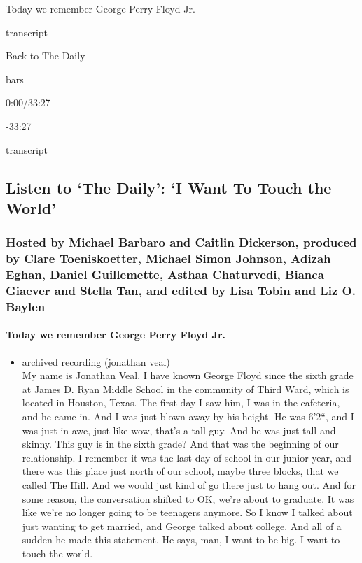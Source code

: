 Today we remember George Perry Floyd Jr.

transcript

Back to The Daily

bars

0:00/33:27

-33:27

transcript

\hypertarget{listen-to-the-daily-i-want-to-touch-the-world-1}{%
\subsection{Listen to `The Daily': `I Want To Touch the
World'}\label{listen-to-the-daily-i-want-to-touch-the-world-1}}

\hypertarget{hosted-by-michael-barbaro-and-caitlin-dickerson-produced-by-clare-toeniskoetter-michael-simon-johnson-adizah-eghan-daniel-guillemette-asthaa-chaturvedi-bianca-giaever-and-stella-tan-and-edited-by-lisa-tobin-and-liz-o-baylen}{%
\subsubsection{Hosted by Michael Barbaro and Caitlin Dickerson, produced
by Clare Toeniskoetter, Michael Simon Johnson, Adizah Eghan, Daniel
Guillemette, Asthaa Chaturvedi, Bianca Giaever and Stella Tan, and
edited by Lisa Tobin and Liz O.
Baylen}\label{hosted-by-michael-barbaro-and-caitlin-dickerson-produced-by-clare-toeniskoetter-michael-simon-johnson-adizah-eghan-daniel-guillemette-asthaa-chaturvedi-bianca-giaever-and-stella-tan-and-edited-by-lisa-tobin-and-liz-o-baylen}}

\hypertarget{today-we-remember-george-perry-floyd-jr}{%
\paragraph{Today we remember George Perry Floyd
Jr.}\label{today-we-remember-george-perry-floyd-jr}}

\begin{itemize}
\tightlist
\item
  archived recording (jonathan veal)\\
  My name is Jonathan Veal. I have known George Floyd since the sixth
  grade at James D. Ryan Middle School in the community of Third Ward,
  which is located in Houston, Texas. The first day I saw him, I was in
  the cafeteria, and he came in. And I was just blown away by his
  height. He was 6'2``, and I was just in awe, just like wow, that's a
  tall guy. And he was just tall and skinny. This guy is in the sixth
  grade? And that was the beginning of our relationship. I remember it
  was the last day of school in our junior year, and there was this
  place just north of our school, maybe three blocks, that we called The
  Hill. And we would just kind of go there just to hang out. And for
  some reason, the conversation shifted to OK, we're about to graduate.
  It was like we're no longer going to be teenagers anymore. So I know I
  talked about just wanting to get married, and George talked about
  college. And all of a sudden he made this statement. He says, man, I
  want to be big. I want to touch the world.
\end{itemize}

